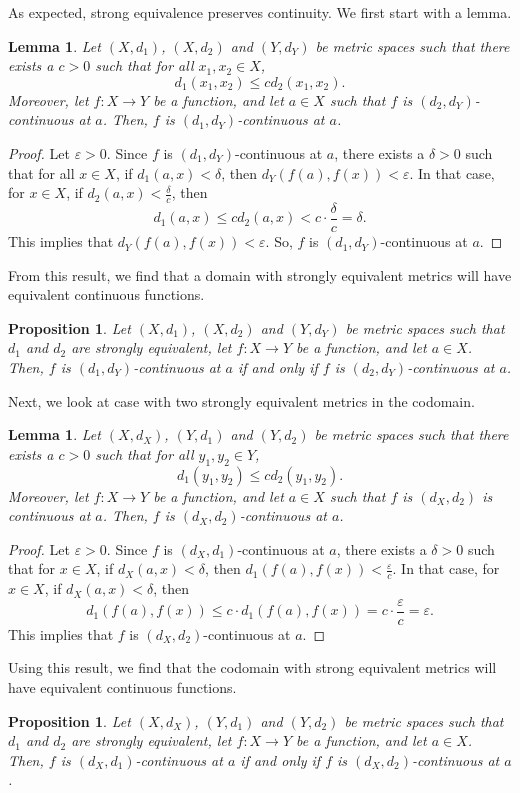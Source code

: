 \documentclass[a4paper, openany]{memoir}
\theoremstyle{definition}
\theoremstyle{plain}
\newtheorem{lemma}[definition]{Lemma}
\newtheorem{proposition}[definition]{Proposition}
\begin{document}
As expected, strong equivalence preserves continuity. We first start with a lemma.
\begin{lemma}
Let $(X, d_1)$, $(X, d_2)$ and $(Y, d_Y)$ be metric spaces such that there exists a $c > 0$ such that for all $x_1, x_2 \in X$,
\[d_1(x_1, x_2) \leqslant cd_2(x_1, x_2).\]
Moreover, let $f: X \to Y$ be a function, and let $a \in X$ such that $f$ is $(d_2, d_Y)$-continuous at $a$. Then, $f$ is $(d_1, d_Y)$-continuous at $a$.
\end{lemma}
\begin{proof}
Let $\varepsilon > 0$. Since $f$ is $(d_1, d_Y)$-continuous at $a$, there exists a $\delta > 0$ such that for all $x \in X$, if $d_1(a, x) < \delta$, then $d_Y(f(a), f(x)) < \varepsilon$. In that case, for $x \in X$, if $d_2(a, x) < \frac{\delta}{c}$, then 
\[d_1(a, x) \leqslant cd_2(a, x) < c \cdot \frac{\delta}{c} = \delta.\]
This implies that $d_Y(f(a), f(x)) < \varepsilon$. So, $f$ is $(d_1, d_Y)$-continuous at $a$.
\end{proof}
\noindent From this result, we find that a domain with strongly equivalent metrics will have equivalent continuous functions.
\begin{proposition}
Let $(X, d_1)$, $(X, d_2)$ and $(Y, d_Y)$ be metric spaces such that $d_1$ and $d_2$ are strongly equivalent, let $f: X \to Y$ be a function, and let $a \in X$. Then, $f$ is $(d_1, d_Y)$-continuous at $a$ if and only if $f$ is $(d_2, d_Y)$-continuous at $a$.
\end{proposition}
\noindent Next, we look at case with two strongly equivalent metrics in the codomain.
\begin{lemma}
Let $(X, d_X)$, $(Y, d_1)$ and $(Y, d_2)$ be metric spaces such that there exists a $c > 0$ such that for all $y_1, y_2 \in Y$,
\[d_1(y_1, y_2) \leqslant cd_2(y_1, y_2).\]
Moreover, let $f: X \to Y$ be a function, and let $a \in X$ such that $f$ is $(d_X, d_2)$ is continuous at $a$. Then, $f$ is $(d_X, d_2)$-continuous at $a$.
\end{lemma}
\begin{proof}
Let $\varepsilon > 0$. Since $f$ is $(d_X, d_1)$-continuous at $a$, there exists a $\delta > 0$ such that for $x \in X$, if $d_X(a, x) < \delta$, then $d_1(f(a), f(x)) < \frac{\varepsilon}{c}$. In that case, for $x \in X$, if $d_X(a, x) < \delta$, then
\[d_1(f(a), f(x)) \leqslant c \cdot d_1(f(a), f(x)) = c \cdot \frac{\varepsilon}{c} = \varepsilon.\]
This implies that $f$ is $(d_X, d_2)$-continuous at $a$.
\end{proof}
\noindent Using this result, we find that the codomain with strong equivalent metrics will have equivalent continuous functions.
\begin{proposition}
Let $(X, d_X)$, $(Y, d_1)$ and $(Y, d_2)$ be metric spaces such that $d_1$ and $d_2$ are strongly equivalent, let $f: X \to Y$ be a function, and let $a \in X$. Then, $f$ is $(d_X, d_1)$-continuous at $a$ if and only if $f$ is $(d_X, d_2)$-continuous at $a$.
\end{proposition}
\end{document}
